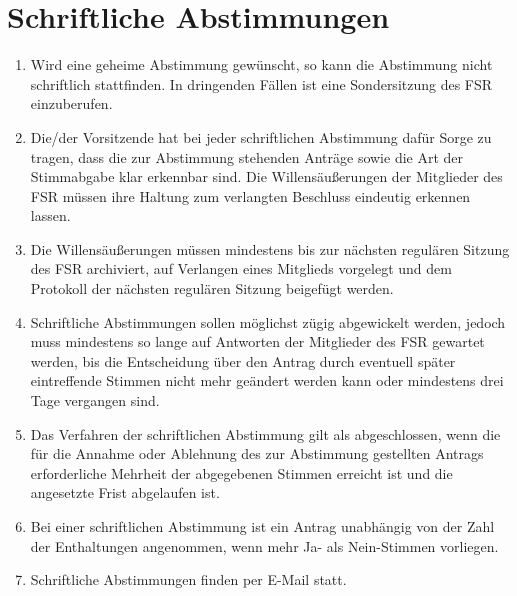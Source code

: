 \section{Schriftliche Abstimmungen}
\label{sec:schriftlich}
\begin{enumerate}
	\item Wird eine geheime Abstimmung gewünscht, so kann die Abstimmung nicht schriftlich stattfinden.
	In dringenden Fällen ist eine Sondersitzung des FSR einzuberufen.
	\item Die/der Vorsitzende hat bei jeder schriftlichen Abstimmung dafür Sorge zu tragen, dass die zur Abstimmung stehenden Anträge sowie die Art der Stimmabgabe klar erkennbar sind.
	Die Willensäußerungen der Mitglieder des FSR müssen ihre Haltung zum verlangten Beschluss eindeutig erkennen lassen.
	\item Die Willensäußerungen müssen mindestens bis zur nächsten regulären Sitzung des FSR archiviert, auf Verlangen eines Mitglieds vorgelegt und dem Protokoll der nächsten regulären Sitzung beigefügt werden.
	\item Schriftliche Abstimmungen sollen möglichst zügig abgewickelt werden, jedoch muss mindestens so lange auf Antworten der Mitglieder des FSR gewartet werden, bis die Entscheidung über den Antrag durch eventuell später eintreffende Stimmen nicht mehr geändert werden kann oder mindestens drei Tage vergangen sind.
	\item Das Verfahren der schriftlichen Abstimmung gilt als abgeschlossen, wenn die für die Annahme oder Ablehnung des zur Abstimmung gestellten Antrags erforderliche Mehrheit der abgegebenen Stimmen erreicht ist und die angesetzte Frist abgelaufen ist.
	\item Bei einer schriftlichen Abstimmung ist ein Antrag unabhängig von der Zahl der Enthaltungen angenommen, wenn mehr Ja- als Nein-Stimmen vorliegen.
	\item Schriftliche Abstimmungen finden per E-Mail statt.
\end{enumerate}

